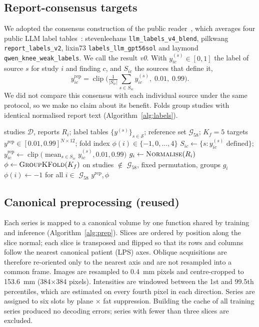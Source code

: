 \documentclass{ieeeaccess}
\newcommand{\gold}{$\mathcal{G}_{58}$}
\begin{document}
\subsection{Report-consensus targets}
\label{sec:method-labels}
We adopted the consensus construction of the public reader~\cite{goodpjw2026reader}, which averages four public LLM
label tables~\cite{labels2026public}: stevenleehans \texttt{llm\_labels\_v4\_blend}, pilkwang \texttt{report\_labels\_v2},
lixin73 \texttt{labels\_llm\_gpt56sol} and laymond \texttt{qwen\_knee\_weak\_labels}. We call the result \emph{v0}. With $y^{(s)}_{ic}\in[0,1]$ the label
of source $s$ for study $i$ and finding $c$, and $S_{ic}$ the sources that define it,
\begin{equation}
y^{\mathrm{rep}}_{ic}=\operatorname{clip}\!\Big(\tfrac{1}{|S_{ic}|}\textstyle\sum_{s\in S_{ic}} y^{(s)}_{ic},\;0.01,\;0.99\Big).
\label{eq:v0}
\end{equation}
We did not compare this consensus with each individual source under the same protocol, so we make no claim about its
benefit. Folds group studies with identical normalised report text (Algorithm~\ref{alg:labels}).

\begin{algorithm}[!t]
\caption{Report-consensus targets and report-grouped folds}
\label{alg:labels}
\begin{algorithmic}[1]
\Require studies $\mathcal{D}$, reports $R_i$; label tables $\{y^{(s)}\}_{s\in\mathcal{S}}$; reference set \gold; $K_f=5$
\Ensure targets $y^{\mathrm{rep}}\in[0.01,0.99]^{N\times12}$; fold index $\phi(i)\in\{-1,0,\dots,4\}$
\For{each study $i\notin$ \gold{} and finding $c$}
  \State $S_{ic}\gets\{s : y^{(s)}_{ic}\text{ defined}\}$;\; $y^{\mathrm{rep}}_{ic}\gets\operatorname{clip}\big(\operatorname{mean}_{s\in S_{ic}}y^{(s)}_{ic},0.01,0.99\big)$
\EndFor
\State $g_i\gets\textsc{Normalise}(R_i)$ 
\State $\phi\gets\textsc{GroupKFold}(K_f)$ on studies $\notin$ \gold{}, fixed permutation, groups $g_i$
\State $\phi(i)\gets-1$ for all $i\in$ \gold
\State \Return $y^{\mathrm{rep}},\phi$
\end{algorithmic}
\end{algorithm}

\subsection{Canonical preprocessing (reused)}
\label{sec:method-prep}
Each series is mapped to a canonical volume by one function shared by training and inference (Algorithm~\ref{alg:prep}).
Slices are ordered by position along the slice normal; each slice is transposed and flipped so that its rows and columns
follow the nearest canonical patient (LPS) axes. Oblique acquisitions are therefore re-oriented only to the nearest axis
and are not resampled into a common frame. Images are resampled to 0.4~mm pixels and centre-cropped to 153.6~mm
(384$\times$384 pixels). Intensities are windowed between the 1st and 99.5th percentiles, which are estimated on every
fourth pixel in each direction. Series are assigned to six slots by plane $\times$ fat suppression. Building the cache of
all training series produced no decoding errors; series with fewer than three slices are excluded.
\end{document}
